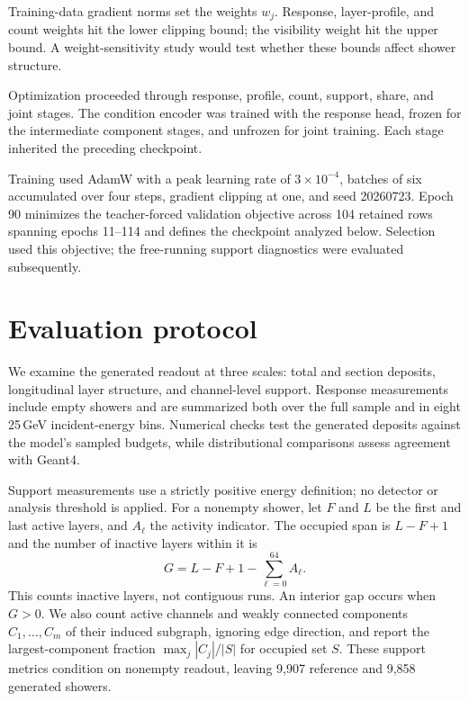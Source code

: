 \documentclass[11pt]{article}
\begin{document}
Training-data gradient norms set the weights $w_j$. Response, layer-profile, and count weights hit the lower clipping bound; the visibility weight hit the upper bound. A weight-sensitivity study would test whether these bounds affect shower structure.

Optimization proceeded through response, profile, count, support, share, and joint stages. The condition encoder was trained with the response head, frozen for the intermediate component stages, and unfrozen for joint training. Each stage inherited the preceding checkpoint.

Training used AdamW with a peak learning rate of $3\times10^{-4}$, batches of six accumulated over four steps, gradient clipping at one, and seed 20260723. Epoch 90 minimizes the teacher-forced validation objective across 104 retained rows spanning epochs 11--114 and defines the checkpoint analyzed below. Selection used this objective; the free-running support diagnostics were evaluated subsequently.

\section{Evaluation protocol}
\label{sec:diagnostics}

We examine the generated readout at three scales: total and section deposits, longitudinal layer structure, and channel-level support. Response measurements include empty showers and are summarized both over the full sample and in eight 25\,GeV incident-energy bins. Numerical checks test the generated deposits against the model's sampled budgets, while distributional comparisons assess agreement with Geant4.

Support measurements use a strictly positive energy definition; no detector or analysis threshold is applied. For a nonempty shower, let $F$ and $L$ be the first and last active layers, and $A_\ell$ the activity indicator. The occupied span is $L-F+1$ and the number of inactive layers within it is
\begin{equation}
 G=L-F+1-\sum_{\ell=0}^{64}A_\ell.
 \label{eq:gaps}
\end{equation}
This counts inactive layers, not contiguous runs. An interior gap occurs when $G>0$. We also count active channels and weakly connected components $C_1,\ldots,C_m$ of their induced subgraph, ignoring edge direction, and report the largest-component fraction $\max_j|C_j|/|S|$ for occupied set $S$. These support metrics condition on nonempty readout, leaving 9,907 reference and 9,858 generated showers.
\end{document}
